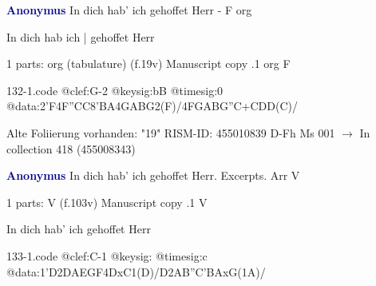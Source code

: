 \documentclass[twocolumn]{book}
\begin{document}
\newline \par \vspace{7pt} \textcolor{darkblue}{\textbf{Anonymus  }}
\newline In dich hab' ich gehoffet Herr - F
\newline org
\newline \begin{itshape}[f.19v, at left:] In dich hab ich | gehoffet Herr\end{itshape} 
\newline \textcolor{darkblue}{}  1 parts: org (tabulature)  (f.19v)
\newline Manuscript copy
.1  org  F  
\begin{filecontents*}{132-1.code}
@clef:G-2
@keysig:bB
@timesig:0
@data:2'F4F''CC{8'BA}4GABG2(F)/4FGABG''C+CDD(C)/
\end{filecontents*}
\newline
%

\newline Alte Foliierung vorhanden: "19"
\newline RISM-ID: 455010839
\newline D-Fh  Ms 001
\newline $\rightarrow$ In collection 418 (455008343)
      
\newline \par \vspace{7pt} \textcolor{darkblue}{\textbf{Anonymus  }}
\newline In dich hab' ich gehoffet Herr. Excerpts. Arr
\newline V
\newline \begin{itshape}\end{itshape} 
\newline \textcolor{darkblue}{}  1 parts: V  (f.103v)
\newline Manuscript copy
.1  V
\newline \begin{footnotesize} In dich hab' ich gehoffet Herr \end{footnotesize}  
\begin{filecontents*}{133-1.code}
@clef:C-1
@keysig:
@timesig:c
@data:1'D2DAEGF4DxC1(D)/D2AB''C'BAxG(1A)/
\end{filecontents*}
\newline
%
\end{document}
